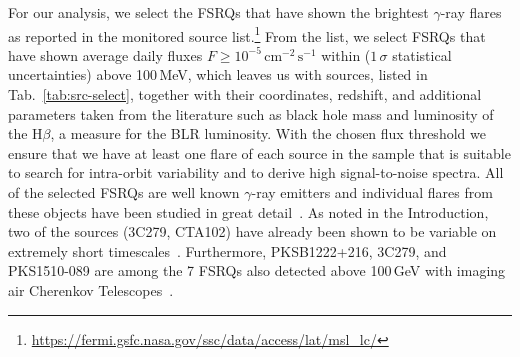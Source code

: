 \documentclass[twocolumn,linenumbers]{aastex62}
\newcommand{\gray}{$\gamma$-ray\xspace}
\begin{document}
For our analysis, we select the FSRQs that have shown the brightest \gray flares as reported in the monitored source list.\footnote{\url{https://fermi.gsfc.nasa.gov/ssc/data/access/lat/msl_lc/}}
From the list, we select FSRQs that have shown average daily fluxes $F \geqslant 10^{-5}\,\mathrm{cm}^{-2}\,\mathrm{s}^{-1}$ within ($1\,\sigma$ statistical uncertainties) above 100\,MeV, which leaves us with sources, listed in Tab.~\ref{tab:src-select}, together with their coordinates, redshift, and additional parameters taken from the literature such as black hole mass and luminosity of the $\mathrm{H}\beta$, a measure for the BLR luminosity.  
With the chosen flux threshold we ensure that we have at least one flare of each source in the sample that is suitable to search for intra-orbit variability and to derive high signal-to-noise spectra. 
All of the selected FSRQs are well known \gray emitters and individual flares from these objects have been studied in great detail~\citep[e.g.,][]{2010ApJ...714L..73A,2011ApJ...733...19T,2015ApJ...808L..48P,TheFermi-LAT:2016dss,2013ApJ...766L..11S,2015ApJ...809..164D,2018ApJ...854L..26S,2011ApJ...733L..26A}. 
As noted in the Introduction, two of the sources (3C279, CTA102) have already been shown to be variable on extremely short timescales~\citep{TheFermi-LAT:2016dss,2018ApJ...854L..26S}. 
Furthermore, PKSB1222+216, 3C279, and PKS1510-089  are among the 7 FSRQs also detected above 100\,GeV with imaging air Cherenkov Telescopes~\citep{2011ApJ...730L...8A,2013A&A...554A.107H,2014A&A...569A..46A,2008Sci...320.1752M}. 
\end{document}
